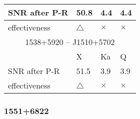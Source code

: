 \begin{tabular}{p{30mm}|p{30mm}|p{30mm}|p{30mm}|p{20mm}}
\hline
SNR after P-R & 50.8        & 4.4        & \multicolumn{2}{l}{4.4}     \\
\hline
effectiveness & $\triangle$ & $\times$   & \multicolumn{2}{l}{$\times$}\\
\hline
\hline
\multicolumn{5}{c}{1538+5920 -- J1510+5702} \\
\hline
              &  X          & Ka         & \multicolumn{2}{l}{Q}       \\
\hline
SNR after P-R & 51.5        & 3.9        & \multicolumn{2}{l}{3.9}     \\
\hline
effectiveness & $\triangle$ & $\times$   & \multicolumn{2}{l}{$\times$}\\
\hline
\end{tabular}

\subsubsection{
  1551+6822
}
